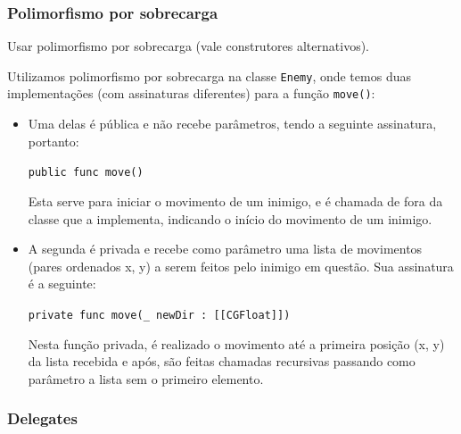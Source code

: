 \documentclass[rel_mlp]{iiufrgs}
\begin{document}


\subsubsection{Polimorfismo por sobrecarga}

Usar polimorfismo por sobrecarga (vale construtores alternativos).

Utilizamos polimorfismo por sobrecarga na classe \texttt{Enemy}, onde temos duas implementações (com assinaturas diferentes) para a função \texttt{move()}:

\begin{itemize}
\setlength{\itemindent}{1em}
    \item Uma delas é pública e não recebe parâmetros, tendo a seguinte assinatura, portanto:
    
    \texttt{public func move()}
    
    Esta serve para iniciar o movimento de um inimigo, e é chamada de fora da classe que a implementa, indicando o início do movimento de um inimigo.
    
    \item A segunda é privada e recebe como parâmetro uma lista de movimentos (pares ordenados x, y) a serem feitos pelo inimigo em questão. Sua assinatura é a seguinte:
    
    \texttt{private func move(\_ newDir : [[CGFloat]])}
    
    Nesta função privada, é realizado o movimento até a primeira posição (x, y) da lista recebida e após, são feitas chamadas recursivas passando como parâmetro a lista sem o primeiro elemento.
\end{itemize}




\subsubsection{Delegates}
\end{document}
